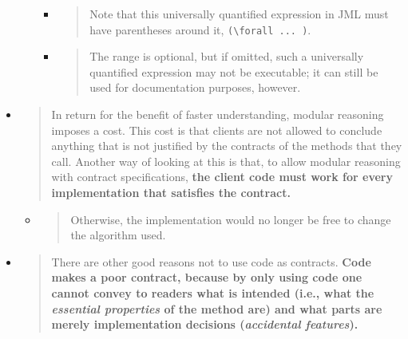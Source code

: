 \documentclass[a4paper]{article}
\begin{document}
\begin{itemize}
\begin{itemize}
    \begin{itemize}
    \item
      \begin{quote}
      Note that this universally quantified expression in JML must have
      parentheses around it, \texttt{(\textbackslash{}forall\ ...\ )}.
      \end{quote}
    \item
      \begin{quote}
      The range is optional, but if omitted, such a universally
      quantified expression may not be executable; it can still be used
      for documentation purposes, however.
      \end{quote}
    \end{itemize}
  \end{itemize}
\item
  \begin{quote}
  In return for the benefit of faster understanding, modular reasoning
  imposes a cost. This cost is that clients are not allowed to conclude
  anything that is not justified by the contracts of the methods that
  they call. Another way of looking at this is that, to allow modular
  reasoning with contract specifications, \textbf{the client code must
  work for every implementation that satisfies the contract.}
  \end{quote}

  \begin{itemize}
  \item
    \begin{quote}
    Otherwise, the implementation would no longer be free to change the
    algorithm used.
    \end{quote}
  \end{itemize}
\item
  \begin{quote}
  There are other good reasons not to use code as contracts.
  \textbf{Code makes a poor contract, because by only using code one
  cannot convey to readers what is intended (i.e., what the
  \emph{essential properties} of the method are) and what parts are
  merely implementation decisions (\emph{accidental features}).}
  \end{quote}


\end{itemize}
\end{document}
